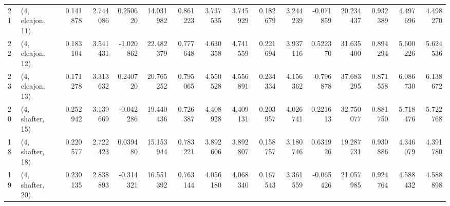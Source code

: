 \begin{tabular}{llrrrrrrrrrrrrrr}
21 &  (4, elcajon, 11) &   0.141878 &  2.744086 &  0.250620 &  14.031982 &  0.861223 &   3.737535 &  3.745929 &  0.182679 &  3.244239 & -0.071859 &   20.234437 &  0.932389 &   4.497696 &   4.498270 \\
22 &  (4, elcajon, 12) &   0.183104 &  3.541431 & -1.020862 &  22.482379 &  0.777648 &   4.630358 &  4.741559 &  0.221694 &  3.937116 &  0.522370 &   31.635400 &  0.894294 &   5.600226 &   5.624536 \\
23 &  (4, elcajon, 13) &   0.171278 &  3.313632 &  0.240720 &  20.765252 &  0.795065 &   4.550528 &  4.556891 &  0.234334 &  4.156362 & -0.796878 &   37.683295 &  0.871558 &   6.086730 &   6.138672 \\
20 &  (4, shafter, 15) &   0.252942 &  3.139669 & -0.042286 &  19.440436 &  0.726387 &   4.408928 &  4.409131 &  0.203957 &  4.026741 &  0.221613 &   32.750077 &  0.881750 &   5.718476 &   5.722768 \\
18 &  (4, shafter, 18) &   0.220577 &  2.722423 &  0.039480 &  15.153944 &  0.783221 &   3.892606 &  3.892807 &  0.158757 &  3.180746 &  0.631926 &   19.287731 &  0.930886 &   4.346079 &   4.391780 \\
19 &  (4, shafter, 20) &   0.230135 &  2.838893 & -0.314321 &  16.551392 &  0.763144 &   4.056180 &  4.068340 &  0.167543 &  3.361559 & -0.065426 &   21.057985 &  0.924764 &   4.588432 &   4.588898 \\
\bottomrule
\end{tabular}
